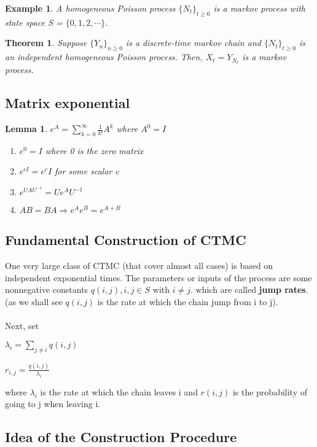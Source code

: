 \documentclass[12pt]{article}
\newtheorem{theorem}{Theorem}
\newtheorem{lemma}{Lemma}
\newtheorem{example}{Example}
\begin{document}
\begin{example}
 A homogeneous Poisson process $\{N_t\}_{t\geq0}$ is a markov process with state space S = $\{0, 1, 2, \cdots\}$.
\end{example}

\begin{theorem}
    Suppose $\{Y_n\}_{n \geq 0}$ is a discrete-time markov chain and $\{N_t\}_{t\geq0}$ is an independent homogeneous Poisson process. Then, $X_t = Y_{N_t}$ is a markov process.
\end{theorem}

\subsection{Matrix exponential}

\begin{lemma}
    $e^{A} = \sum_{k = 0}^{\infty } \frac{1}{k!}A^k $ where $A^0 = I$
    \begin{enumerate}
        \item $e^0 = I$ where 0 is the zero matrix
        \item $e^{cI} = e^cI$ for some scalar c
        \item $e^{UAU^{-1}} = Ue^AU^{-1}$
        \item $AB = BA \Rightarrow e^Ae^B = e^{A+B}$
    \end{enumerate}
\end{lemma}

\subsection{Fundamental Construction of CTMC}

One very large class of CTMC (that cover almost all cases) is based on independent exponential times. The parameters or inputs of the process are some nonnegative constants $q(i,j), i, j \in S$ with $i \ne j$. which are called \textbf{jump rates}. (as we shall see $q(i,j)$ is the rate at which the chain jump from i to j).
\\
\\Next, set
\begin{center}
$\lambda _{i} = \sum_{j \ne i} q(i,j)$

$r_{i,j} = \frac{q(i,j)}{\lambda_i}$
\end{center}
where $\lambda_i$ is the rate at which the chain leaves i and $r(i,j)$ is the probability of going to j when leaving i.

\subsection{Idea of the Construction Procedure}
\end{document}

